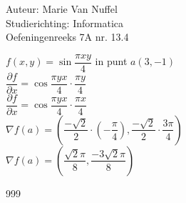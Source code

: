 \documentclass[a4paper]{article}
\begin{document}
  
\noindent \large Auteur: Marie Van Nuffel \\
\noindent \large Studierichting: Informatica\\
\noindent \large Oefeningenreeks 7A nr. 13.4\\

\medskip

\normalsize

$f(x,y) = \sin{\dfrac{\pi xy}{4}}$ in punt $a(3,-1)$\\

$\dfrac{\partial f}{\partial x} = \cos{\dfrac{\pi yx}{4}} \cdot \dfrac{\pi y}{4}$\\

$\dfrac{\partial f}{\partial x} = \cos{\dfrac{\pi yx}{4}} \cdot \dfrac{\pi x}{4}$\\

$\nabla f(a) = (\dfrac{-\sqrt{2}}{2} \cdot (-\dfrac{\pi}{4}), \dfrac{-\sqrt{2}}{2} \cdot \dfrac{3\pi}{4})$\\

$\nabla f(a) = (\dfrac{\sqrt{2}\pi}{8}, \dfrac{-3\sqrt{2}\pi}{8})$


\begin{thebibliography}{999}
\end{thebibliography}
\end{document}
